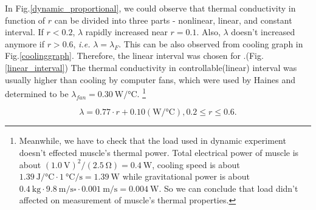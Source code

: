 In Fig.\ref{dynamic_proportional}, we could observe that thermal conductivity in function of $r$ can be divided into three parts - nonlinear, linear, and constant interval. If $r<0.2$, $\lambda$ rapidly increased near $r=0.1$. Also, $\lambda$ doesn't increased anymore if $r>0.6$, {\it i.e.} $\lambda = \lambda_{F}$. This can be also observed from cooling graph in Fig.\ref{coolinggraph}.
Therefore, the linear interval was chosen for \Apcnospace.(Fig.\ref{linear_interval}) The thermal conductivity in controllable(linear) interval was usually higher than cooling by computer fans, which were used by Haines \etalspace and determined to be $\lambda_{fan}=\SI{0.30}{\watt\per\degreeCelsius}$.
\footnote{
	Meanwhile, we have to check that the load used in dynamic experiment doesn't effected muscle's thermal power. %
	Total electrical power of muscle is about $(\SI{1.0}{\volt})^2/(\SI{2.5}{\ohm})=\SI{0.4}{\watt}$, cooling speed is about $\SI{1.39}{\joule\per\degreeCelsius} \cdot \SI{1}{\degreeCelsius\per\second}=\SI{1.39}{\watt}$ while gravitational power is about  $\SI{0.4}{\kilo\gram} \cdot  \SI{9.8}{\meter\per\second\square} \cdot \SI{0.001}{\meter\per\second}=\SI{0.004}{\watt}$. So we can conclude that load didn't affected on measurement of muscle's thermal properties.
}

\begin{equation} \label{lambda_control}
\lambda = 0.77\cdot r + 0.10 (\si{\watt\per\degreeCelsius}), 0.2\leq r \leq 0.6.
\end{equation}





